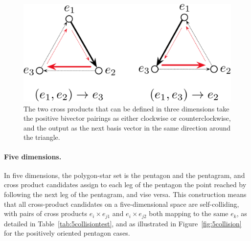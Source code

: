 \documentclass[11pt]{article}
\newcommand{\bv}[1][]{e_{#1}}
\begin{document}
\begin{figure}[tbp]
\begin{center}
\includegraphics[width=.75\textwidth]{CrossProducts3D.pdf}
\caption{The two cross products that can be defined in three dimensions take the positive bivector pairings as either clockwise or counterclockwise, and the output as the next basis vector in the same direction around the triangle.}
\label{fig:CrossProducts3D}
\end{center}
\end{figure}

\clearpage


\paragraph{Five dimensions.}
In five dimensions, the polygon-star set is the pentagon and the pentagram, and cross product candidates assign to each leg of the pentagon the point reached by following the next leg of the pentagram, and vise versa. This construction means that all cross-product candidates on a five-dimensional space are self-colliding, with pairs of cross products $\bv[i]\times\bv[j1]$ and $\bv[i]\times\bv[j2]$ both mapping to the same $\bv[k]$, as  detailed in Table~\ref{tab:5collisiontest}, and as illustrated in Figure~\ref{fig:5collision} for the positively oriented pentagon cases.
%
\end{document}
